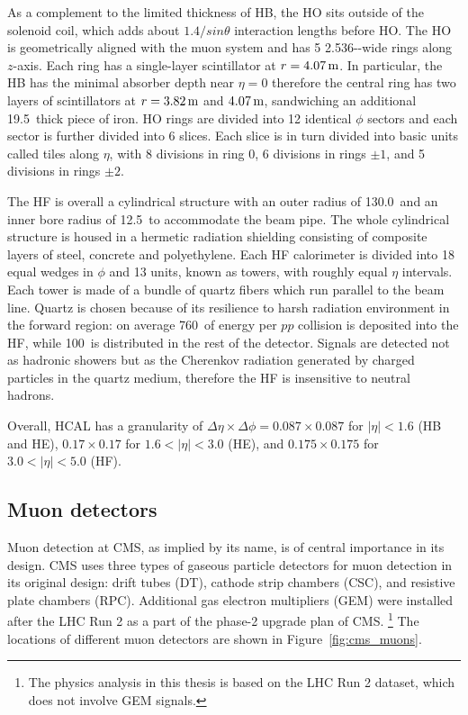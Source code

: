 As a complement to the limited thickness of HB, 
the HO sits outside of the solenoid coil, which adds about $1.4 / sin\theta$ interaction lengths before HO.
The HO is geometrically aligned with the muon system and has 5 2.536-\meter-wide rings along $z$-axis.
Each ring has a single-layer scintillator at $r = 4.07 \meter$.
In particular, the HB has the minimal absorber depth near $\eta = 0$ therefore the central ring has 
two layers of scintillators at $r = 3.82 \meter$ and $4.07 \meter$, sandwiching an additional 19.5~\cm thick piece of iron.
HO rings are divided into 12 identical $\phi$ sectors and each sector is further divided into 6 slices.
Each slice is in turn divided into basic units called tiles along $\eta$, with 8 divisions in ring 0, 6 divisions in rings $\pm 1$, and 5 divisions in rings $\pm 2$. 

The HF is overall a cylindrical structure with an outer radius of 130.0~\cm and an inner bore radius of 12.5~\cm to accommodate the beam pipe.
The whole cylindrical structure is housed in a hermetic radiation shielding consisting of composite layers of steel, concrete and polyethylene. 
Each HF calorimeter is divided into 18 equal wedges in $\phi$ and 13 units, known as towers, with roughly equal $\eta$ intervals. 
Each tower is made of a bundle of quartz fibers which run parallel to the beam line.
Quartz is chosen because of its resilience to harsh radiation environment in the forward region:
on average 760~\GeV of energy per $pp$ collision is deposited into the HF, while 100~\GeV is distributed in the rest of the detector.
Signals are detected not as hadronic showers but as the Cherenkov radiation generated by charged particles in the quartz medium, 
therefore the HF is insensitive to neutral hadrons.

Overall, HCAL has a granularity of $\Delta\eta \times \Delta\phi = 0.087 \times 0.087$ for $|\eta| < 1.6$ (HB and HE), 
$0.17 \times 0.17$ for $1.6 < |\eta| < 3.0$ (HE), and $0.175 \times 0.175$ for $3.0 < |\eta| < 5.0$ (HF).


\subsection{Muon detectors}\label{sec:muon_chambers}

Muon detection at CMS, as implied by its name, is of central importance in its design.
CMS uses three types of gaseous particle detectors for muon detection in its original design:
drift tubes (DT), cathode strip chambers (CSC), and resistive plate chambers (RPC).
Additional gas electron multipliers (GEM) were installed after the LHC Run 2 as a part of the phase-2 upgrade plan of CMS.
\footnote{The physics analysis in this thesis is based on the LHC Run 2 dataset, which does not involve GEM signals.} 
The locations of different muon detectors are shown in Figure~\ref{fig:cms_muons}.

